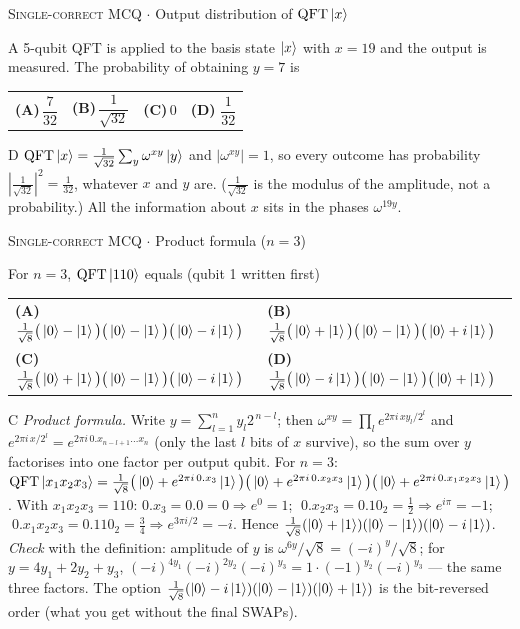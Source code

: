 \documentclass[11pt,a4paper]{article}
\newcommand{\optlabel}[1]{\textbf{(#1)}}
\newcommand{\correctlabel}[1]{\textcolor{okgreen}{\textbf{(#1)}\,\ding{51}}}
\newenvironment{qitem}[1]{\begin{list}{}{\setlength{\leftmargin}{3.3em}\setlength{\labelwidth}{3.1em}%
  \setlength{\labelsep}{0.2em}\setlength{\topsep}{3pt}\setlength{\parsep}{3pt}}\item[\textbf{Q.#1}\hfill]}{\end{list}}
\newcommand{\qsep}{\par\vspace{2pt}{\color{black!15}\hrule}\vspace{4pt}}
\newcommand{\qmeta}[2]{{\footnotesize\color{black!60}\textsc{#1} \;$\cdot$\; #2}\par}
\begin{document}
\begin{qitem}{42}
\qmeta{Single-correct MCQ}{Output distribution of $\mathrm{QFT}\ket{x}$}
A 5-qubit QFT is applied to the basis state $\ket{x}$ with $x = 19$ and the output is measured. The probability of
obtaining $y = 7$ is
\par\smallskip\noindent\begin{tabularx}{\linewidth}{@{}*{4}{L}@{}}
\optlabel{A}\,$\dfrac{7}{32}$ & \optlabel{B}\,$\dfrac{1}{\sqrt{32}}$ & \optlabel{C}\,$0$ & \correctlabel{D}\,$\dfrac{1}{32}$
\end{tabularx}
\end{qitem}
\begin{solbox}{D}
$\mathrm{QFT}\ket{x} = \frac{1}{\sqrt{32}}\sum_y \omega^{xy}\ket y$ and $|\omega^{xy}| = 1$, so every outcome has probability
$\left|\frac{1}{\sqrt{32}}\right|^2 = \frac{1}{32}$, whatever $x$ and $y$ are. ($\frac{1}{\sqrt{32}}$ is the modulus of the amplitude,
not a probability.) All the information about $x$ sits in the phases $\omega^{19y}$.
\end{solbox}
\qsep

\begin{qitem}{43}
\qmeta{Single-correct MCQ}{Product formula ($n = 3$)}
For $n = 3$, $\mathrm{QFT}\ket{110}$ equals (qubit 1 written first)
\par\smallskip\noindent\begin{tabularx}{\linewidth}{@{}*{2}{L}@{}}
\optlabel{A}\,$\frac{1}{\sqrt8}\big(\ket0 - \ket1\big)\big(\ket0 - \ket1\big)\big(\ket0 - i\ket1\big)$ & \optlabel{B}\,$\frac{1}{\sqrt8}\big(\ket0 + \ket1\big)\big(\ket0 - \ket1\big)\big(\ket0 + i\ket1\big)$ \\[3pt]
\correctlabel{C}\,$\frac{1}{\sqrt8}\big(\ket0 + \ket1\big)\big(\ket0 - \ket1\big)\big(\ket0 - i\ket1\big)$ & \optlabel{D}\,$\frac{1}{\sqrt8}\big(\ket0 - i\ket1\big)\big(\ket0 - \ket1\big)\big(\ket0 + \ket1\big)$
\end{tabularx}
\end{qitem}
\begin{solbox}{C}
\emph{Product formula.} Write $y = \sum_{l=1}^{n} y_l 2^{\,n-l}$; then $\omega^{xy} = \prod_{l}e^{2\pi i\,x y_l/2^{l}}$ and
$e^{2\pi i\,x/2^l} = e^{2\pi i\,0.x_{n-l+1}\dots x_n}$ (only the last $l$ bits of $x$ survive), so the sum over $y$ factorises into one
factor per output qubit. For $n = 3$: $\mathrm{QFT}\ket{x_1x_2x_3} = \frac{1}{\sqrt8}
\big(\ket0 + e^{2\pi i\,0.x_3}\ket1\big)\big(\ket0 + e^{2\pi i\,0.x_2x_3}\ket1\big)\big(\ket0 + e^{2\pi i\,0.x_1x_2x_3}\ket1\big)$.
With $x_1x_2x_3 = 110$: $0.x_3 = 0.0 = 0 \Rightarrow e^{0} = 1$; $\;0.x_2x_3 = 0.10_2 = \frac12 \Rightarrow e^{i\pi} = -1$;
$\;0.x_1x_2x_3 = 0.110_2 = \frac34 \Rightarrow e^{3\pi i/2} = -i$. Hence
$\frac{1}{\sqrt8}(\ket0 + \ket1)(\ket0 - \ket1)(\ket0 - i\ket1)$.
\emph{Check} with the definition: amplitude of $y$ is $\omega^{6y}/\sqrt8 = (-i)^{y}/\sqrt8$; for $y = 4y_1 + 2y_2 + y_3$,
$(-i)^{4y_1}(-i)^{2y_2}(-i)^{y_3} = 1\cdot(-1)^{y_2}(-i)^{y_3}$ --- the same three factors. The option
$\frac{1}{\sqrt8}(\ket0 - i\ket1)(\ket0 - \ket1)(\ket0 + \ket1)$ is the bit-reversed order (what you get without the final SWAPs).
\end{solbox}
\qsep
\end{document}
